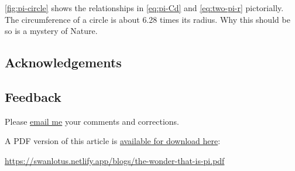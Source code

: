 \documentclass[
  a4paper,
]{article}
\begin{document}
\cref{fig:pi-circle} shows the relationships in \cref{eq:pi-Cd} and
\cref{eq:two-pi-r} pictorially. The circumference of a circle is about
6.28 times its radius. Why this should be so is a mystery of Nature.

\subsection{Acknowledgements}\label{acknowledgements}

\subsection{Feedback}\label{feedback}

Please \href{mailto:feedback.swanlotus@gmail.com}{email me} your
comments and corrections.

\noindent A PDF version of this article is
\href{./the-wonder-that-is-pi.pdf}{available for download here}:

\begin{small}

\begin{sffamily}

\url{https://swanlotus.netlify.app/blogs/the-wonder-that-is-pi.pdf}

\end{sffamily}

\end{small}
\end{document}
